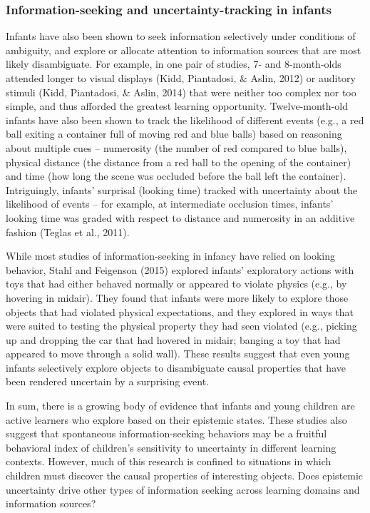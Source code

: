 \documentclass[english,man]{apa6}
\theoremstyle{definition}
\theoremstyle{definition}
\theoremstyle{definition}
\theoremstyle{remark}
\begin{document}
\subsubsection{Information-seeking and uncertainty-tracking in
infants}\label{information-seeking-and-uncertainty-tracking-in-infants}

Infants have also been shown to seek information selectively under
conditions of ambiguity, and explore or allocate attention to
information sources that are most likely disambiguate. For example, in
one pair of studies, 7- and 8-month-olds attended longer to visual
displays (Kidd, Piantadosi, \& Aslin, 2012) or auditory stimuli (Kidd,
Piantadosi, \& Aslin, 2014) that were neither too complex nor too
simple, and thus afforded the greatest learning opportunity.
Twelve-month-old infants have also been shown to track the likelihood of
different events (e.g., a red ball exiting a container full of moving
red and blue balls) based on reasoning about multiple cues -- numerosity
(the number of red compared to blue balls), physical distance (the
distance from a red ball to the opening of the container) and time (how
long the scene was occluded before the ball left the container).
Intriguingly, infants' surprisal (looking time) tracked with uncertainty
about the likelihood of events -- for example, at intermediate occlusion
times, infants' looking time was graded with respect to distance and
numerosity in an additive fashion (Teglas et al., 2011).

While most studies of information-seeking in infancy have relied on
looking behavior, Stahl and Feigenson (2015) explored infants'
exploratory actions with toys that had either behaved normally or
appeared to violate physics (e.g., by hovering in midair). They found
that infants were more likely to explore those objects that had violated
physical expectations, and they explored in ways that were suited to
testing the physical property they had seen violated (e.g., picking up
and dropping the car that had hovered in midair; banging a toy that had
appeared to move through a solid wall). These results suggest that even
young infants selectively explore objects to disambiguate causal
properties that have been rendered uncertain by a surprising event.

In sum, there is a growing body of evidence that infants and young
children are active learners who explore based on their epistemic
states. These studies also suggest that spontaneous information-seeking
behaviors may be a fruitful behavioral index of children's sensitivity
to uncertainty in different learning contexts. However, much of this
research is confined to situations in which children must discover the
causal properties of interesting objects. Does epistemic uncertainty
drive other types of information seeking across learning domains and
information sources?
\end{document}
